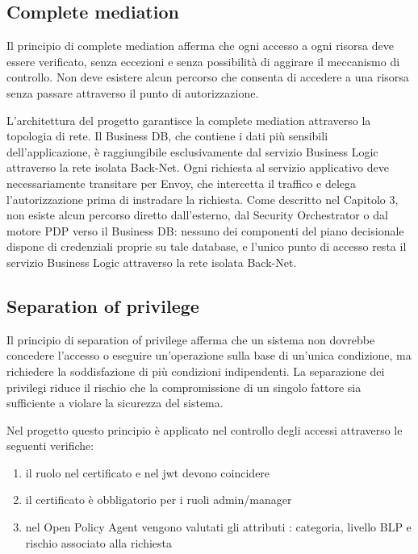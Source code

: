 \subsection{Complete mediation}

Il principio di complete mediation afferma che ogni accesso a ogni risorsa deve essere verificato, senza eccezioni e senza possibilità di aggirare il meccanismo di controllo. Non deve esistere alcun percorso che consenta di accedere a una risorsa senza passare attraverso il punto di autorizzazione.

L'architettura del progetto garantisce la complete mediation attraverso la topologia di rete. Il Business DB, che contiene i dati più sensibili dell'applicazione, è raggiungibile esclusivamente dal servizio Business Logic attraverso la rete isolata Back-Net. Ogni richiesta al servizio applicativo deve necessariamente transitare per Envoy, che intercetta il traffico e delega l'autorizzazione prima di instradare la richiesta. Come descritto nel Capitolo 3, non esiste alcun percorso diretto dall'esterno, dal Security Orchestrator o dal motore PDP verso il Business DB: nessuno dei componenti del piano decisionale dispone di credenziali proprie su tale database, e l'unico punto di accesso resta il servizio Business Logic attraverso la rete isolata Back-Net.

\subsection{Separation of privilege}

Il principio di separation of privilege afferma che un sistema non dovrebbe concedere l'accesso o eseguire un'operazione sulla base di un'unica condizione, ma richiedere la soddisfazione di più condizioni indipendenti. La separazione dei privilegi riduce il rischio che la compromissione di un singolo fattore sia sufficiente a violare la sicurezza del sistema.

Nel progetto questo principio è applicato nel controllo degli accessi attraverso le seguenti verifiche:
\begin{enumerate}
    \item il ruolo nel certificato e nel jwt devono coincidere
    \item il certificato è obbligatorio per i ruoli admin/manager
    \item nel Open Policy Agent vengono valutati gli attributi : categoria, livello BLP e rischio associato alla richiesta
\end{enumerate}

